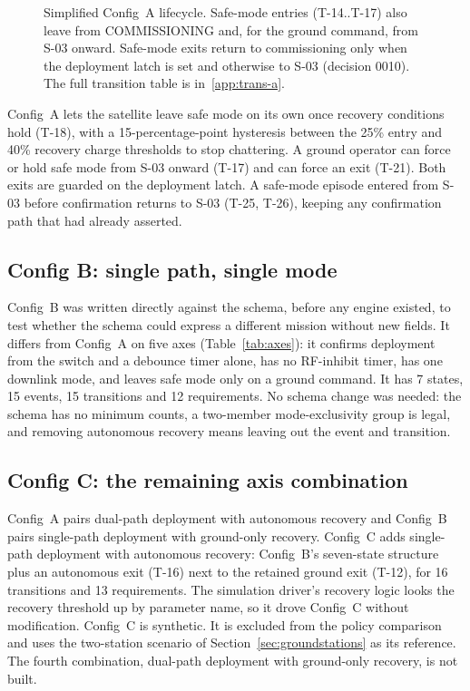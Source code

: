 \documentclass[preprint,12pt]{elsarticle}
\newcommand{\cfgA}{Config~A}
\newcommand{\cfgB}{Config~B}
\newcommand{\cfgC}{Config~C}
\begin{document}
\begin{figure}[t]
{}
\caption{Simplified \cfgA{} lifecycle. Safe-mode entries (T-14..T-17) also leave from COMMISSIONING and, for the ground command, from S-03 onward. Safe-mode exits return to commissioning only when the deployment latch is set and otherwise to S-03 (decision 0010). The full transition table is in~\ref{app:trans-a}.}
\label{fig:config-a}
\end{figure}

\cfgA{} lets the satellite leave safe mode on its own once recovery conditions hold (T-18), with a 15-percentage-point hysteresis between the 25\% entry and 40\% recovery charge thresholds to stop chattering. A ground operator can force or hold safe mode from S-03 onward (T-17) and can force an exit (T-21). Both exits are guarded on the deployment latch. A safe-mode episode entered from S-03 before confirmation returns to S-03 (T-25, T-26), keeping any confirmation path that had already asserted.

\subsection{Config B: single path, single mode}

\cfgB{} was written directly against the schema, before any engine existed, to test whether the schema could express a different mission without new fields. It differs from \cfgA{} on five axes (Table~\ref{tab:axes}): it confirms deployment from the switch and a debounce timer alone, has no RF-inhibit timer, has one downlink mode, and leaves safe mode only on a ground command. It has 7 states, 15 events, 15 transitions and 12 requirements. No schema change was needed: the schema has no minimum counts, a two-member mode-exclusivity group is legal, and removing autonomous recovery means leaving out the event and transition.

\subsection{Config C: the remaining axis combination}

\cfgA{} pairs dual-path deployment with autonomous recovery and \cfgB{} pairs single-path deployment with ground-only recovery. \cfgC{} adds single-path deployment with autonomous recovery: \cfgB{}'s seven-state structure plus an autonomous exit (T-16) next to the retained ground exit (T-12), for 16 transitions and 13 requirements. The simulation driver's recovery logic looks the recovery threshold up by parameter name, so it drove \cfgC{} without modification. \cfgC{} is synthetic. It is excluded from the policy comparison and uses the two-station scenario of Section~\ref{sec:groundstations} as its reference. The fourth combination, dual-path deployment with ground-only recovery, is not built.
\end{document}
